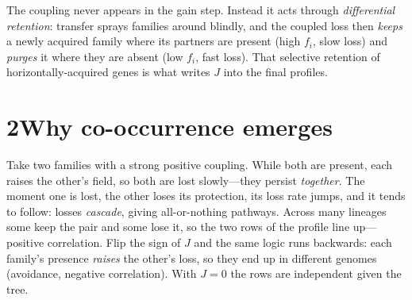 \documentclass[11pt]{article}
\begin{document}
The coupling never appears in the gain step. Instead it acts through \emph{differential
retention}: transfer sprays families around blindly, and the coupled loss then \emph{keeps}
a newly acquired family where its partners are present (high $f_i$, slow loss) and
\emph{purges} it where they are absent (low $f_i$, fast loss). That selective retention of
horizontally-acquired genes is what writes $J$ into the final profiles.

\section*{\textcolor{mainblue}{2\quad Why co-occurrence emerges}}
\begin{minipage}[t]{0.60\textwidth}
\vspace{2pt}
Take two families with a strong positive coupling. While both are present, each raises the
other's field, so both are lost slowly---they persist \emph{together}. The moment one is
lost, the other loses its protection, its loss rate jumps, and it tends to follow: losses
\emph{cascade}, giving all-or-nothing pathways. Across many lineages some keep the pair and
some lose it, so the two rows of the profile line up---positive correlation. Flip the sign
of $J$ and the same logic runs backwards: each family's presence \emph{raises} the other's
loss, so they end up in different genomes (avoidance, negative correlation). With $J=0$ the
rows are independent given the tree.
\end{minipage}\hfill
\begin{minipage}[t]{0.36\textwidth}
\vspace{0pt}
\centering
{}
\end{minipage}
\end{document}
